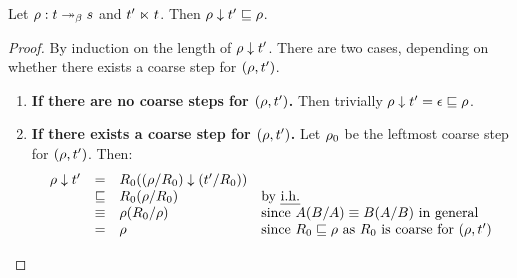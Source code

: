 \begin{lemma}
Let $\rho : t \mathrel{\twoheadrightarrow_\beta} s$ and $t' \mathrel{\ltimes} t$.
Then $\rho \downarrow t' \sqsubseteq \rho$.
\end{lemma}
\begin{proof}
By induction on the length of $\rho \downarrow t'$.
There are two cases, depending on whether there exists a coarse step for $(\rho,t')$.
\begin{enumerate}
\item {\bf If there are no coarse steps for $(\rho,t')$.}
  Then trivially $\rho \downarrow t' = \epsilon \sqsubseteq \rho$.
\item {\bf If there exists a coarse step for $(\rho,t')$.}
  Let $\rho_0$ be the leftmost coarse step for $(\rho,t')$.
  Then:
  \[
    \begin{array}{rcll}
      \rho \downarrow t'
      & = & R_0((\rho/R_0) \downarrow (t'/R_0)) \\
      & \sqsubseteq & R_0(\rho/R_0) & \text{by {\em i.h.}} \\
      & \equiv  & \rho(R_0/\rho)  & \text{since $A(B/A) \equiv B(A/B)$ in general} \\
      & =       & \rho                    & \text{since $R_0 \sqsubseteq \rho$ as $R_0$ is coarse for $(\rho,t')$} \\
    \end{array}
  \]
\end{enumerate}
\end{proof}

